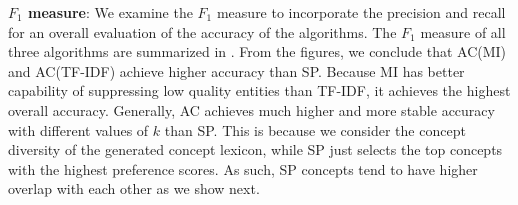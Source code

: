 \textbf{$F_1$ measure}: We examine the $F_1$ measure to
incorporate the precision and recall for an overall
evaluation of the accuracy of the algorithms.
The $F_1$ measure of all three algorithms are summarized in
.
From the figures, we conclude that AC(MI) and AC(TF-IDF) achieve
higher accuracy than SP.
Because MI has better capability of suppressing low quality entities
than TF-IDF, it achieves the highest overall accuracy.
Generally, AC achieves much higher and more stable accuracy
with different values of $k$ than SP.
This is because we consider the concept diversity of the generated concept
lexicon, while SP just selects the top concepts with the highest
preference scores. As such, SP concepts tend to have higher overlap
with each other as we show next.

